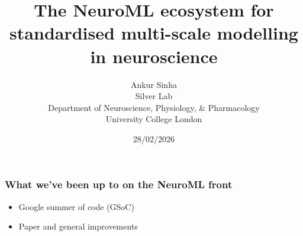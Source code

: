
\usepackage{color}
\usepackage{tipa}
\usepackage[scale=2]{ccicons}
\usepackage{amssymb}
\usepackage{jneurosci}
\usepackage{subcaption}
\usepackage[T1]{fontenc}
\usepackage[utf8]{inputenc}
% 
\usepackage[sfdefault]{roboto}
\usepackage[normalem]{ulem}
\usepackage{hyperref}
\hypersetup{colorlinks,linkcolor=Green,urlcolor=links}
\usepackage{graphicx}
\usepackage{algorithmic}
\usepackage{textcomp}
\usepackage{wrapfig}
\usepackage{textgreek}
\usepackage{euler}
\usepackage{tabularx}
\usepackage{booktabs}
\usepackage{minted}
\usepackage{csquotes}


\renewcommand{\footnoterule}{}

\title{The NeuroML ecosystem for standardised multi-scale modelling in neuroscience}
\author[Ankur Sinha]{Ankur Sinha\\Silver Lab\\Department of Neuroscience, Physiology, \& Pharmacology\\University College London}
\date{28/02/2026}




\begin{frame}
  \titlepage{}
\end{frame}
\begin{frame}[c]
  \frametitle{What we've been up to on the NeuroML front}
  \begin{itemize}
    \item Google summer of code (GSoC)
    \item Paper and general improvements
  \end{itemize}
\end{frame}
